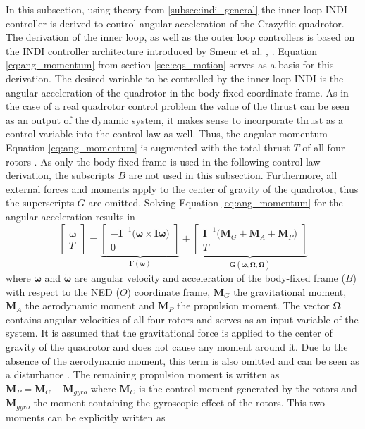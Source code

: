 \documentclass[11pt, a4paper, twoside]{report}
\begin{document}
In this subsection, using theory from \ref{subsec:indi_general} the inner loop \acrshort{INDI} controller is derived to control angular acceleration of the Crazyflie quadrotor. The derivation of the inner loop, as well as the outer loop controllers is based on the \acrshort{INDI} controller architecture introduced by Smeur et al. \cite{Smeur1}, \cite{Smeur2}. Equation \ref{eq:ang_momentum} from section \ref{sec:eqs_motion} serves as a basis for this derivation. The desired variable to be controlled by the inner loop \acrshort{INDI} is the angular acceleration of the quadrotor in the body-fixed coordinate frame. As in the case of a real quadrotor control problem the value of the thrust can be seen as an output of the dynamic system, it makes sense to incorporate thrust as a control variable into the control law as well. Thus, the angular momentum Equation \ref{eq:ang_momentum} is augmented with the total thrust $T$ of all four rotors \cite{Smeur2}. As only the body-fixed frame is used in the following control law derivation, the subscripts $B$ are not used in this subsection. Furthermore, all external forces and moments apply to the center of gravity of the quadrotor, thus the superscripts $G$ are omitted. 
Solving Equation \ref{eq:ang_momentum} for the angular acceleration results in
\begin{equation}
	\begin{bmatrix}
		\dot{\bm{\omega}}\\
		T
	\end{bmatrix} = 
	\underbrace{
	\begin{bmatrix}
		-\bm{I}^{-1} \big(\bm{\omega} \times \bm{I} \bm{\omega} \big)\\
		0
	\end{bmatrix}}_\text{$\bm{F}(\bm{\omega})$} +
	\underbrace{	
	\begin{bmatrix}
		\bm{I}^{-1} \big( \bm{M}_G + \bm{M}_{A} +  \bm{M}_{P} \big)\\
		T
	\end{bmatrix}}_\text{$\bm{G}(\bm{\omega}, \bm{\Omega}, \bm{\dot{\Omega}})$}
	\label{eq:main_eom_indi_inner}
\end{equation}
where $\bm{\omega}$ and $\dot{\bm{\omega}}$ are angular velocity and acceleration of the body-fixed frame ($B$) with respect to the \acrshort{NED} ($O$) coordinate frame, $\bm{M}_G$ the gravitational moment, $\bm{M}_A$ the aerodynamic moment and $\bm{M}_P$ the propulsion moment. The vector $\bm{\Omega}$ contains angular velocities of all four rotors and serves as an input variable of the system. It is assumed that the gravitational force is applied to the center of gravity of the quadrotor and does not cause any moment around it. Due to the absence of the aerodynamic moment, this term is also omitted and can be seen as a disturbance \cite{Smeur1}. The remaining propulsion moment is written as $\bm{M}_P=\bm{M}_C-\bm{M}_{gyro}$ where $\bm{M}_C$ is the control moment generated by the rotors and $\bm{M}_{gyro}$ the moment containing the gyroscopic effect of the rotors. This two moments can be explicitly written as
\end{document}
